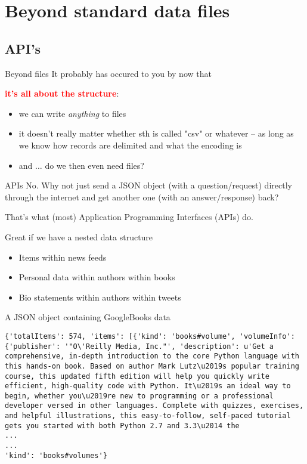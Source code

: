 \section{Beyond standard data files}
\subsection{API's}

\begin{frame}{Beyond files}
It probably has occured to you by now that


\textcolor{red}{\large{\textbf{it's all about the structure}}}:
\begin{itemize}
	\item<2-> we can write \textit{anything} to files
	\item<3-> it doesn't really matter whether sth is called "csv" or whatever -- as long as we know how records are delimited and what the encoding is
	\item<4-> and $\ldots$ do we then even need files?
\end{itemize}

\end{frame}

\begin{frame}{APIs}
	{\huge{No.}}
	Why not just send a JSON object (with a question/request) directly through the internet and get another one (with an answer/response) back?
	
	That's what (most) Application Programming Interfaces (APIs) do.
	
	\begin{block}{Great if we have a nested data structure}
		\begin{itemize}
			\item<2-> Items within news feeds
			\item<3-> Personal data within authors within books
			\item<4-> Bio statements within authors within tweets
		\end{itemize}
	\end{block}
\end{frame}


\begin{frame}[fragile]{A JSON object containing GoogleBooks data}
	\begin{lstlisting}
{'totalItems': 574, 'items': [{'kind': 'books#volume', 'volumeInfo': {'publisher': '"O\'Reilly Media, Inc."', 'description': u'Get a comprehensive, in-depth introduction to the core Python language with this hands-on book. Based on author Mark Lutz\u2019s popular training course, this updated fifth edition will help you quickly write efficient, high-quality code with Python. It\u2019s an ideal way to begin, whether you\u2019re new to programming or a professional developer versed in other languages. Complete with quizzes, exercises, and helpful illustrations, this easy-to-follow, self-paced tutorial gets you started with both Python 2.7 and 3.3\u2014 the
...
...
'kind': 'books#volumes'}
	\end{lstlisting}
\end{frame}



